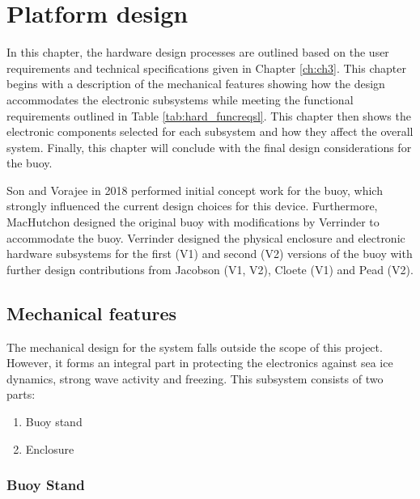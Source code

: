 
\chapter{Platform design}
\label{sec:ch3_platform}

In this chapter, the hardware design processes are outlined based on the user requirements and technical specifications given in Chapter \ref{ch:ch3}. This chapter begins with a description of the mechanical features showing how the design accommodates the electronic subsystems while meeting the functional requirements outlined in Table \ref{tab:hard_funcreqsl}. This chapter then shows the electronic components selected for each subsystem and how they affect the overall system. Finally, this chapter will conclude with the final design considerations for the buoy. \par 

Son and Vorajee in 2018 performed initial concept work for the buoy, which strongly influenced the current design choices for this device. Furthermore, MacHutchon designed the original buoy with modifications by Verrinder to accommodate the buoy. Verrinder designed the physical enclosure and electronic hardware subsystems for the first (V1) and second (V2) versions of the buoy with further design contributions from Jacobson (V1, V2), Cloete (V1) and Pead (V2).
\section{Mechanical features}

The mechanical design for the system falls outside the scope of this project. However, it forms an integral part in protecting the electronics against sea ice dynamics, strong wave activity and freezing. This subsystem consists of two parts: 

\begin{enumerate}
	\item Buoy stand
	\item Enclosure
\end{enumerate}


\subsection{Buoy Stand}

